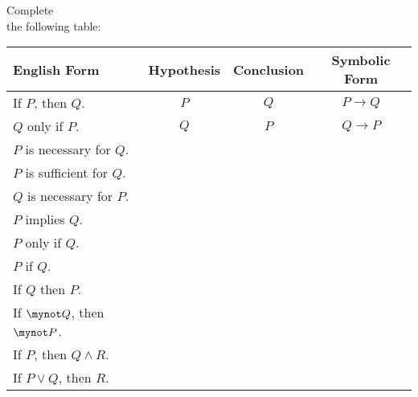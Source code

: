 \begin{activity}\label{A:working}
Complete \\the following table:
\begin{center}
\begin{tabular}{|l|c|c|c|}
  \hline
  \textbf{English Form}  &  \textbf{Hypothesis}  &  \textbf{Conclusion} &  \textbf{Symbolic Form} \\ \hline
  If $P$, then $Q$.          &  $P$  &  $Q$  &  $P \to Q$  \\ \hline
  $Q$ only if $P$.           &  $Q$  &  $P$  &  $Q \to P$  \\ \hline
  $P$ is necessary for $Q$.  &       &       &             \\ \hline
  $P$ is sufficient for $Q$. &       &       &             \\ \hline
  $Q$ is necessary for $P$.  &       &       &             \\ \hline
  $P$ implies $Q$.           &       &       &             \\ \hline
  $P$ only if $Q$.           &       &       &             \\ \hline
  $P$ if $Q$.                &       &       &             \\ \hline
  If $Q$ then $P$.           &       &       &             \\ \hline
  If  $\mynot  Q$, then $\mynot  P$. &  &   &             \\ \hline
  If $P$, then $Q \wedge R$. &       &       &             \\ \hline
  If $P \vee Q$, then $R$.   &       &       &             \\ \hline
\end{tabular}
\end{center}
\end{activity}
\hbreak
